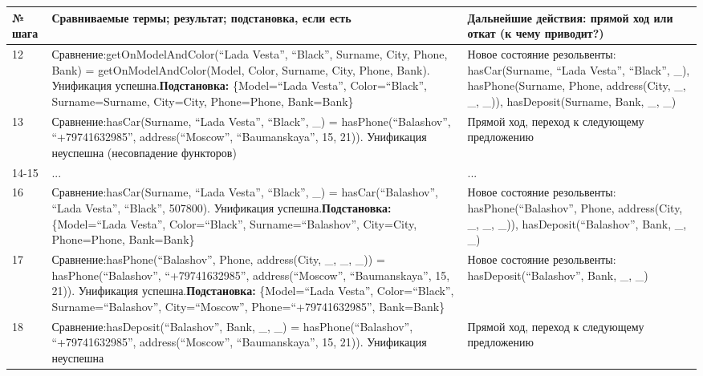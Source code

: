 \documentclass[14pt,a4paper]{scrreprt}
\begin{document}
\begin{enumerate}
\begin{table}[H]
	\centering
	\begin{tabular}{|p{1.2cm\small}|p{9cm\small}|p{5cm\small}|}
		\hline
		№ шага & Сравниваемые термы; результат; подстановка, если есть & Дальнейшие действия: прямой ход или откат (к чему приводит?)\\
		\hline
		12 & Сравнение:\linebreak getOnModelAndColor(``Lada Vesta'', ``Black'', Surname, City, Phone, Bank) = getOnModelAndColor(Model, Color, Surname, City, Phone, Bank). Унификация успешна.\linebreak \textbf{Подстановка:} \{Model=``Lada Vesta'', Color=``Black'', Surname=Surname, City=City, Phone=Phone, Bank=Bank\} & Новое состояние резольвенты: hasCar(Surname, ``Lada Vesta'', ``Black'', \_), hasPhone(Surname, Phone, address(City, \_, \_, \_)), hasDeposit(Surname, Bank, \_, \_)\\
		\hline 
		13 & Сравнение:\linebreak hasCar(Surname, ``Lada Vesta'', ``Black'', \_) = hasPhone(``Balashov'', ``+79741632985'', address(``Moscow'', ``Baumanskaya'', 15, 21)). Унификация неуспешна (несовпадение функторов) & Прямой ход, переход к следующему предложению\\
		\hline
		14-15 & ... & ...\\
		\hline
		16 & Сравнение:\linebreak hasCar(Surname, ``Lada Vesta'', ``Black'', \_) = hasCar(``Balashov'', ``Lada Vesta'', ``Black'', 507800). Унификация успешна.\linebreak \textbf{Подстановка:} \{Model=``Lada Vesta'', Color=``Black'', Surname=``Balashov'', City=City, Phone=Phone, Bank=Bank\} & Новое состояние резольвенты: hasPhone(``Balashov'', Phone, address(City, \_, \_, \_)), hasDeposit(``Balashov'', Bank, \_, \_)\\
		\hline
		17 & Сравнение:\linebreak hasPhone(``Balashov'', Phone, address(City, \_, \_, \_)) = hasPhone(``Balashov'', ``+79741632985'', address(``Moscow'', ``Baumanskaya'', 15, 21)).  Унификация успешна.\linebreak \textbf{Подстановка:} \{Model=``Lada Vesta'', Color=``Black'', Surname=``Balashov'', City=``Moscow'', Phone=``+79741632985'', Bank=Bank\} & Новое состояние резольвенты:  hasDeposit(``Balashov'', Bank, \_, \_)\\
		\hline
		18 & Сравнение:\linebreak hasDeposit(``Balashov'', Bank, \_, \_) =  hasPhone(``Balashov'', ``+79741632985'', address(``Moscow'', ``Baumanskaya'', 15, 21)).  Унификация неуспешна & Прямой ход, переход к следующему предложению\\

\end{tabular}
\end{table}
\end{enumerate}
\end{document}
